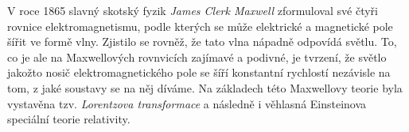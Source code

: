 \documentclass{../../../../style/mkimain}
\begin{document}
\noindent{}
\proborigin{}
\klein

V roce 1865 slavný skotský fyzik \emph{James Clerk Maxwell} zformuloval své čtyři rovnice elektromagnetismu,
podle kterých se může elektrické a magnetické pole šířit ve formě vlny. %
Zjistilo se rovněž, že tato vlna nápadně odpovídá světlu.
To, co je ale na Maxwellových rovnvicích zajímavé a podivné, je tvrzení,
že světlo jakožto nosič elektromagnetického pole se šíří konstantní rychlostí nezávisle na tom, z jaké soustavy se na něj díváme.
Na základech této Maxwellovy teorie byla vystavěna tzv. \emph{Lorentzova transformace}
a následně i věhlasná Einsteinova speciální teorie relativity.

\end{document}
